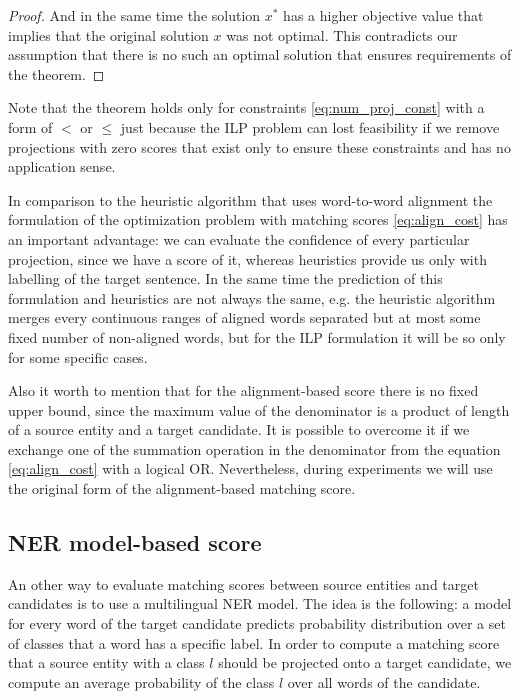 \begin{proof}
    And in the same time the solution \( x^* \) has a higher objective value that implies that the original solution \( x \) was not optimal.
    This contradicts our assumption that there is no such an optimal solution that ensures requirements of the theorem.
\end{proof}
Note that the theorem holds only for constraints \eqref{eq:num_proj_const} with a form of \( < \) or
\( \leq \) just because the ILP problem can lost feasibility if we remove projections with zero scores that
exist only to ensure these constraints and has no application sense.

In comparison to the heuristic algorithm that uses word-to-word alignment the formulation of the optimization
problem with matching scores \eqref{eq:align_cost} has an important advantage: we can evaluate the confidence of
every particular projection, since we have a score of it, whereas heuristics provide us only with labelling of the target
sentence. In the same time the prediction of this formulation and heuristics are not always the same, e.g.
the heuristic algorithm merges every continuous ranges of aligned words separated but at most some fixed number of non-aligned words,
but for the ILP formulation it will be so only for some specific cases.

Also it worth to mention that for the alignment-based score there is no fixed upper bound, since
the maximum value of the denominator is a product of length of a source entity and a target candidate.
It is possible to overcome it if we exchange one of the summation operation in the denominator from the
equation \eqref{eq:align_cost} with a logical OR. Nevertheless, during experiments we will use the
original form of the alignment-based matching score.

\subsection{NER model-based score}

An other way to evaluate matching scores between source entities and target candidates is to
use a multilingual NER model. The idea is the following: a model for every word of the target candidate
predicts probability distribution over a set of classes that a word has a specific label. In order to compute
a matching score that a source entity with a class \( l \) should be projected onto a target candidate,
we compute an average probability of the class \( l \) over all words of the candidate.

